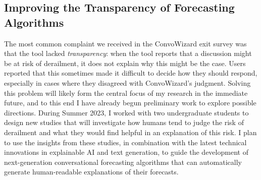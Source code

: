 \documentclass[12pt,letterpaper]{article}
\begin{document}
\subsection{Improving the Transparency of Forecasting Algorithms}
The most common complaint we received in the ConvoWizard exit survey was that the tool lacked \emph{transparency}: when the tool reports that a discussion might be at risk of derailment, it does not explain why this might be the case.
Users reported that this sometimes made it difficult to decide how they should respond, especially in cases where they disagreed with ConvoWizard's judgment.
Solving this problem will likely form the central focus of my research in the immediate future, and to this end I have already begun preliminary work to explore possible directions.
During Summer 2023, I worked with two undergraduate students to design new studies that will investigate how humans tend to judge the risk of derailment and what they would find helpful in an explanation of this risk.
I plan to use the insights from these studies, in combination with the latest technical innovations in explainable AI and text generation, to guide the development of next-generation conversational forecasting algorithms that can automatically generate human-readable explanations of their forecasts.

\end{document}
